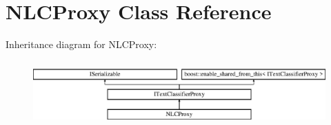 \hypertarget{class_n_l_c_proxy}{}\section{N\+L\+C\+Proxy Class Reference}
\label{class_n_l_c_proxy}
Inheritance diagram for N\+L\+C\+Proxy\+:\begin{figure}[H]
\begin{center}
\leavevmode
\includegraphics[height=2.514970cm]{class_n_l_c_proxy}
\end{center}
\end{figure}

